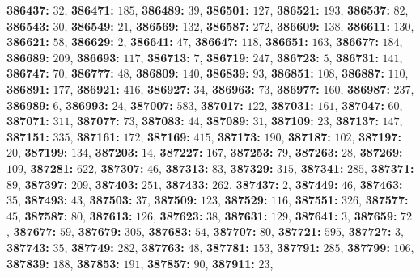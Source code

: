 \textsf{\bfseries 386437:} $32$, \textsf{\bfseries 386471:} $185$, \textsf{\bfseries 386489:} $39$, \textsf{\bfseries 386501:} $127$, \textsf{\bfseries 386521:} $193$, \textsf{\bfseries 386537:} $82$, \textsf{\bfseries 386543:} $30$, \textsf{\bfseries 386549:} $21$, \textsf{\bfseries 386569:} $132$, \textsf{\bfseries 386587:} $272$, \textsf{\bfseries 386609:} $138$, \textsf{\bfseries 386611:} $130$, \textsf{\bfseries 386621:} $58$, \textsf{\bfseries 386629:} $2$, \textsf{\bfseries 386641:} $47$, \textsf{\bfseries 386647:} $118$, \textsf{\bfseries 386651:} $163$, \textsf{\bfseries 386677:} $184$, \textsf{\bfseries 386689:} $209$, \textsf{\bfseries 386693:} $117$, \textsf{\bfseries 386713:} $7$, \textsf{\bfseries 386719:} $247$, \textsf{\bfseries 386723:} $5$, \textsf{\bfseries 386731:} $141$, \textsf{\bfseries 386747:} $70$, \textsf{\bfseries 386777:} $48$, \textsf{\bfseries 386809:} $140$, \textsf{\bfseries 386839:} $93$, \textsf{\bfseries 386851:} $108$, \textsf{\bfseries 386887:} $110$, \textsf{\bfseries 386891:} $177$, \textsf{\bfseries 386921:} $416$, \textsf{\bfseries 386927:} $34$, \textsf{\bfseries 386963:} $73$, \textsf{\bfseries 386977:} $160$, \textsf{\bfseries 386987:} $237$, \textsf{\bfseries 386989:} $6$, \textsf{\bfseries 386993:} $24$, \textsf{\bfseries 387007:} $583$, \textsf{\bfseries 387017:} $122$, \textsf{\bfseries 387031:} $161$, \textsf{\bfseries 387047:} $60$, \textsf{\bfseries 387071:} $311$, \textsf{\bfseries 387077:} $73$, \textsf{\bfseries 387083:} $44$, \textsf{\bfseries 387089:} $31$, \textsf{\bfseries 387109:} $23$, \textsf{\bfseries 387137:} $147$, \textsf{\bfseries 387151:} $335$, \textsf{\bfseries 387161:} $172$, \textsf{\bfseries 387169:} $415$, \textsf{\bfseries 387173:} $190$, \textsf{\bfseries 387187:} $102$, \textsf{\bfseries 387197:} $20$, \textsf{\bfseries 387199:} $134$, \textsf{\bfseries 387203:} $14$, \textsf{\bfseries 387227:} $167$, \textsf{\bfseries 387253:} $79$, \textsf{\bfseries 387263:} $28$, \textsf{\bfseries 387269:} $109$, \textsf{\bfseries 387281:} $622$, \textsf{\bfseries 387307:} $46$, \textsf{\bfseries 387313:} $83$, \textsf{\bfseries 387329:} $315$, \textsf{\bfseries 387341:} $285$, \textsf{\bfseries 387371:} $89$, \textsf{\bfseries 387397:} $209$, \textsf{\bfseries 387403:} $251$, \textsf{\bfseries 387433:} $262$, \textsf{\bfseries 387437:} $2$, \textsf{\bfseries 387449:} $46$, \textsf{\bfseries 387463:} $35$, \textsf{\bfseries 387493:} $43$, \textsf{\bfseries 387503:} $37$, \textsf{\bfseries 387509:} $123$, \textsf{\bfseries 387529:} $116$, \textsf{\bfseries 387551:} $326$, \textsf{\bfseries 387577:} $45$, \textsf{\bfseries 387587:} $80$, \textsf{\bfseries 387613:} $126$, \textsf{\bfseries 387623:} $38$, \textsf{\bfseries 387631:} $129$, \textsf{\bfseries 387641:} $3$, \textsf{\bfseries 387659:} $72$, \textsf{\bfseries 387677:} $59$, \textsf{\bfseries 387679:} $305$, \textsf{\bfseries 387683:} $54$, \textsf{\bfseries 387707:} $80$, \textsf{\bfseries 387721:} $595$, \textsf{\bfseries 387727:} $3$, \textsf{\bfseries 387743:} $35$, \textsf{\bfseries 387749:} $282$, \textsf{\bfseries 387763:} $48$, \textsf{\bfseries 387781:} $153$, \textsf{\bfseries 387791:} $285$, \textsf{\bfseries 387799:} $106$, \textsf{\bfseries 387839:} $188$, \textsf{\bfseries 387853:} $191$, \textsf{\bfseries 387857:} $90$, \textsf{\bfseries 387911:} $23$, 
